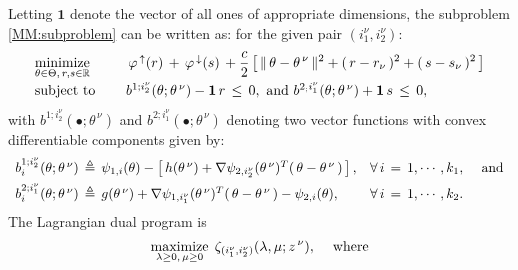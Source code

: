 \documentclass{siamart}
\newcommand{\epc}{\hspace{1pc}}
\begin{document}
Letting $\mathbf{1}$ denote the vector of all ones of appropriate dimensions, the subproblem \eqref{MM:subproblem} can
be written as: for the given pair $(i_1^{\nu},i_2^{\nu})$:
\begin{equation}\label{subproblem1}
\begin{array}{ll}
\displaystyle\operatornamewithlimits{\mbox{minimize}}_{\theta\in \Theta,\, r, s\in\mathbb{R}}\epc  &
 \, \varphi^{\,\uparrow}(r)\,+\,\varphi^{\,\downarrow}(s)\,  + \displaystyle\frac{c}{2}
\left[\,\|\,\theta - \theta^{\,\nu}\,\|^2 + (\, r - r_{\nu} \, )^2 + (\, s - s_{\nu} \, )^2 \,\right]\\[0.1in]
\mbox{subject to} \epc
&  b^{1;i_2^{\nu}}(\theta;\theta^{\, \nu}) - \mathbf{1} \, r \, \leq \, 0, \mbox{ and } b^{2_;i_1^{\nu}}(\theta;\theta^{\, \nu})
+ \mathbf{1} \, s \, \leq \, 0,
\end{array}
\end{equation}
with $b^{1;i_2^{\nu}}(\bullet;\theta^{\, \nu})$ and $b^{2;i_1^{\nu}}(\bullet;\theta^{\, \nu})$ denoting two vector functions
with convex differentiable  components given by:
\[ \begin{array}{ll}
b^{1;i_2^{\nu}}_i(\theta;\theta^{\, \nu}) \, \triangleq \, \psi_{1,i}(\theta) - \left[ \, h(\theta^{\, \nu}) +
\nabla \psi_{2,i_2^{\nu}}(\theta^{\, \nu})^T ( \, \theta - \theta^{\, \nu} \, ) \, \right], & \forall \, i \, = \, 1, \cdots, k_1,
\epc \mbox{and} \\ [5pt]
b^{2;i_1^{\nu}}_i(\theta;\theta^{\, \nu}) \, \triangleq \, g(\theta^{\, \nu}) +
\nabla \psi_{1,i_1^{\nu}}(\theta^{\, \nu})^T ( \, \theta - \theta^{\, \nu} \, ) - \psi_{2,i}(\theta), & \forall \, i \, = \, 1, \cdots, k_2.
\end{array} \]
The Lagrangian dual program is
\[
\displaystyle\operatornamewithlimits{\mbox{maximize}}_{\lambda\geq 0, \,\mu\geq 0}\; \zeta_{(i_1^{\nu},i_2^{\nu})}(\lambda,\mu;z^{\, \nu}),\epc\mbox{where}
\]
\end{document}
